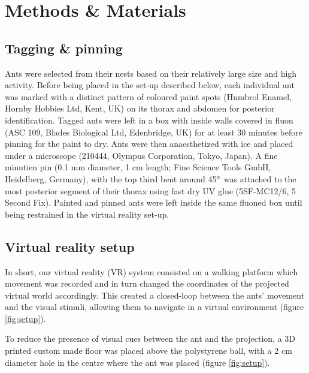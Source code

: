 \section{Methods \& Materials} \label{methods}
\subsection{Tagging \& pinning}
Ants were selected from their nests based on their relatively large size and high activity. Before being placed in the set-up described below, each individual ant was marked with a distinct pattern of coloured paint spots (Humbrol Enamel, Hornby Hobbies Ltd, Kent, UK) on its thorax and abdomen for posterior identification. Tagged ants were left in a box with inside walls covered in fluon (ASC 109, Blades Biological Ltd, Edenbridge, UK) for at least 30 minutes before pinning for the paint to dry. Ants were then anaesthetized with ice and placed under a microscope (210444, Olympus Corporation, Tokyo, Japan). A fine minutien pin (0.1 mm diameter, 1 cm length; Fine Science Tools GmbH, Heidelberg, Germany), with the top third bent around 45$\degree$ was attached to the most posterior segment of their thorax using fast dry UV glue (5SF-MC12/6, 5 Second Fix). Painted and pinned ants were left inside the same fluoned box until being restrained in the virtual reality set-up.

\subsection{Virtual reality setup}
In short, our virtual reality (VR) system consisted on a walking platform which movement was recorded and in turn changed the coordinates of the projected virtual world accordingly. This created a closed-loop between the ants’ movement and the visual stimuli, allowing them to navigate in a virtual environment (figure \ref{fig:setup}).

To reduce the presence of visual cues between the ant and the projection, a 3D printed custom made floor was placed above the polystyrene ball, with a 2 cm diameter hole in the centre where the ant was placed (figure \ref{fig:setup}). 

